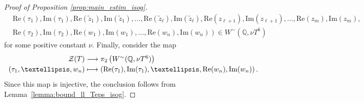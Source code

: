\documentclass[10pt,a4paper]{amsart}
\newcommand{\Q}{\mathbb{Q}}
\newcommand{\pt}[1]{\left( #1 \right)}
\renewcommand{\Im}{\mathrm{Im}}
\renewcommand{\Re}{\mathrm{Re}}
\begin{document}
\begin{proof}[Proof of Proposition \ref{prop:main_estim_isog}]
\begin{align*}
& \left. \Re(\tau_1), \Im(\tau_1), \Re(\widetilde{z}_1), \Im(\widetilde{z}_1), \ldots, \Re(\widetilde{z}_{\ell}), \Im(\widetilde{z}_{\ell}), \Re(z_{\ell+1}), \Im(z_{\ell+1}), \ldots, \Re(z_m), \Im(z_m), \right.\\  
& \left. \Re(\tau_2), \Im(\tau_2), \Re(w_1), \Im(w_1), \ldots, \Re(w_n), \Im(w_n)\right) \in W^{\sim} (\Q, \nu T^6)
\end{align*} 
for some positive constant $\nu$.  
Finally, consider the map 
$$\setlength{\arraycolsep}{0pt}
\renewcommand{\arraystretch}{1.2}
  \begin{array}{ r c l }
    \mathcal{Z}(T) & {} \longrightarrow {} & \pi_2\pt{W^{\sim} (\Q, \nu T^6)}\\
     (\tau_1, \ldots, w_n)      & {} \longmapsto {} & \pt{\Re(\tau_1), \Im(\tau_1), \ldots, \Re(w_n), \Im(w_n)}.
  \end{array}$$
Since this map is injective, the conclusion follows from Lemma~\ref{lemma:bound_ll_Teps_isog}.
\end{proof}
\end{document}

